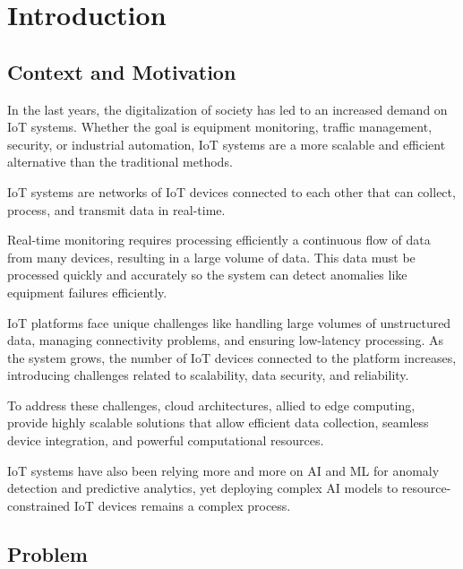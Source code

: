 
%

\chapter{Introduction}
\label{cha:introduction}

\section{Context and Motivation}
In the last years, the digitalization of society has led to an increased
demand on \gls{IoT} systems. Whether the goal is equipment monitoring, traffic
management, security, or industrial automation, \gls{IoT} systems are a more
scalable and efficient alternative than the traditional methods.

\gls{IoT} systems are networks of \gls{IoT} devices connected to each other
that can collect, process, and transmit data in real-time.

Real-time monitoring requires processing efficiently a continuous flow of data from many
devices, resulting in a large volume of data. This data must be processed
quickly and accurately so the system can detect anomalies like equipment failures
efficiently.

IoT platforms face unique challenges like handling large volumes of
unstructured data, managing connectivity problems, and ensuring low-latency
processing. As the system grows, the number of \gls{IoT} devices connected to
the platform increases, introducing challenges related to scalability, data
security, and reliability.

To address these challenges, cloud architectures, allied to edge computing, provide highly scalable solutions
that allow efficient data collection, seamless device integration, and powerful
computational resources.

\gls{IoT} systems have also been relying more and more on \gls{AI} and \gls{ML} for
anomaly detection and predictive analytics, yet deploying complex \gls{AI}
models to resource-constrained \gls{IoT} devices remains a complex process.

\section{Problem}

